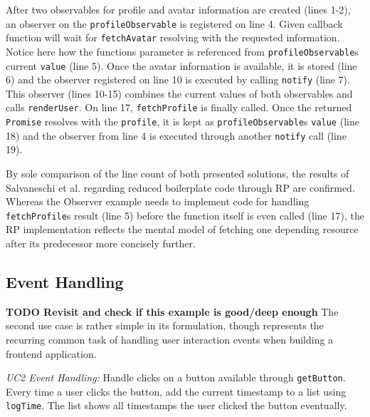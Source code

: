 \documentclass[12pt,a4paper]{article}
\begin{document}
After two observables for profile and avatar information are created (lines 1-2), an observer on the \texttt{profileObservable} is registered on line 4. Given callback function will wait for \texttt{fetchAvatar} resolving with the requested information. Notice here how the functions parameter is referenced from \texttt{profileObservable}s current \texttt{value} (line 5). Once the avatar information is available, it is stored (line 6) and the observer registered on line 10 is executed by calling \texttt{notify} (line 7). This observer (lines 10-15) combines the current values of both observables and calls \texttt{renderUser}. On line 17, \texttt{fetchProfile} is finally called. Once the returned \texttt{Promise} resolves with the \texttt{profile}, it is kept as \texttt{profileObservable}s \texttt{value} (line 18) and the observer from line 4 is executed through another \texttt{notify} call (line 19).

By sole comparison of the line count of both presented solutions, the results of Salvaneschi et al. \cite{7827078} regarding reduced boilerplate code through RP are confirmed. Whereas the Observer example needs to implement code for handling \texttt{fetchProfile}s result (line 5) before the function itself is even called (line 17), the RP implementation reflects the mental model of fetching one depending resource after its predecessor more concisely further.

\subsection{Event Handling}

\textbf{TODO Revisit and check if this example is good/deep enough} The second use case is rather simple in its formulation, though represents the recurring common task of handling user interaction events when building a frontend application.

\begin{framed}
	\noindent\emph{UC2 Event Handling:} Handle clicks on a button available through \texttt{getButton}. Every time a user clicks the button, add the current timestamp to a list using \texttt{logTime}. The list shows all timestamps the user clicked the button eventually.
\end{framed}
\end{document}
